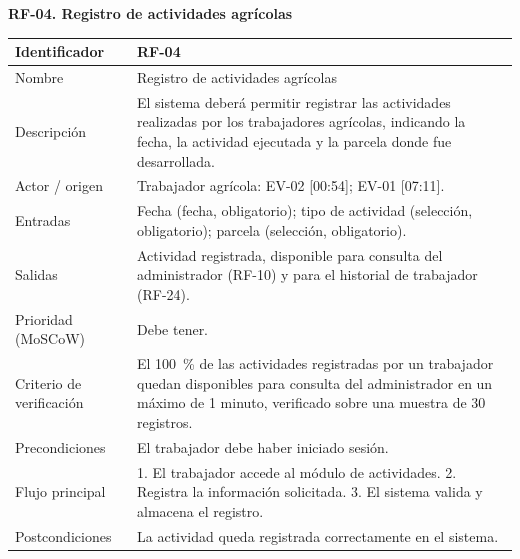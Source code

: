 \documentclass[12pt,a4paper]{article}
\begin{document}
\begin{minipage}{\linewidth}
\bigskip
\noindent\textbf{RF-04. Registro de actividades agrícolas}
\label{tab:RF-04}

\begin{center}
\begin{tabular}{|p{3.5cm}|p{10.7cm}|}
\hline
Identificador & RF-04 \\
\hline
Nombre & Registro de actividades agrícolas \\
\hline
Descripción & El sistema deberá permitir registrar las actividades realizadas por los trabajadores agrícolas, indicando la fecha, la actividad ejecutada y la parcela donde fue desarrollada. \\
\hline
Actor / origen & Trabajador agrícola: EV-02 [00:54]; EV-01 [07:11]. \\
\hline
Entradas & Fecha (fecha, obligatorio); tipo de actividad (selección, obligatorio); parcela (selección, obligatorio). \\
\hline
Salidas & Actividad registrada, disponible para consulta del administrador (RF-10) y para el historial de trabajador (RF-24). \\
\hline
Prioridad (MoSCoW) & Debe tener. \\
\hline
Criterio de verificación & El 100~\% de las actividades registradas por un trabajador quedan disponibles para consulta del administrador en un máximo de 1 minuto, verificado sobre una muestra de 30 registros. \\
\hline
Precondiciones & El trabajador debe haber iniciado sesión. \\
\hline
Flujo principal & 1. El trabajador accede al módulo de actividades. 2. Registra la información solicitada. 3. El sistema valida y almacena el registro. \\
\hline
Postcondiciones & La actividad queda registrada correctamente en el sistema. \\
\hline
\end{tabular}
\end{center}
\end{minipage}
\end{document}
